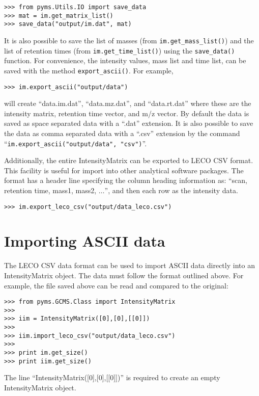 \begin{verbatim}
>>> from pyms.Utils.IO import save_data
>>> mat = im.get_matrix_list()
>>> save_data("output/im.dat", mat)
\end{verbatim}

It is also possible to save the list of masses (from {\tt im.get\_mass\_list()})
and the list of retention times (from {\tt im.get\_time\_list()}) using the
{\tt save\_data()} function. For convenience, the intensity values, mass list
 and time list, can be saved with the method {\tt export\_ascii()}. For example,

\begin{verbatim}
>>> im.export_ascii("output/data")
\end{verbatim}

\noindent
will create ``data.im.dat'', ``data.mz.dat'', and ``data.rt.dat'' where these
are the intensity matrix, retention time vector, and m/z vector. By default
the data is saved as space separated data with a ``.dat'' extension. It is
also possible to save the data as comma separated data with a ``.csv''
extension by the command ``{\tt im.export\_ascii("output/data", "csv")}''.

Additionally, the entire IntensityMatrix can be exported to LECO CSV format.
This facility is useful for import into other analytical software packages.
The format has a header line specifying the column heading information as:
``scan, retention time, mass1, mass2, $\dots$'', and then each row as the
intensity data.

\begin{verbatim}
>>> im.export_leco_csv("output/data_leco.csv")
\end{verbatim}

\section{Importing ASCII data}


The LECO CSV data format can be used to import ASCII data directly into an
IntensityMatrix object.  The data must follow the format outlined above.
For example, the file saved above can be read and compared to the original:

\begin{verbatim}
>>> from pyms.GCMS.Class import IntensityMatrix
>>>
>>> iim = IntensityMatrix([0],[0],[[0]])
>>>
>>> iim.import_leco_csv("output/data_leco.csv")
>>>
>>> print im.get_size()
>>> print iim.get_size()
\end{verbatim}

The line ``IntensityMatrix([0],[0],[[0]])'' is required to create an empty
IntensityMatrix object.

